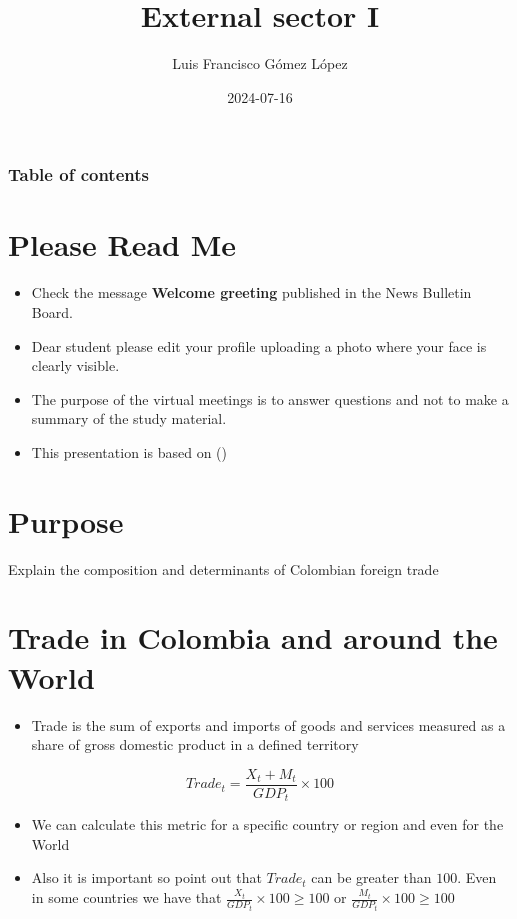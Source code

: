 \documentclass[
  ignorenonframetext,
]{beamer}
\title{External sector I}
\author{Luis Francisco Gómez López}
\date{2024-07-16}
\institute{FAEDIS}
\providecommand{\tightlist}{%
  \setlength{\itemsep}{0pt}\setlength{\parskip}{0pt}}\usepackage{longtable,booktabs,array}
\renewcommand*\contentsname{Table of contents}
\newcommand\contentsname{Table of contents}
\begin{document}
\frame{\titlepage}

\renewcommand*\contentsname{Table of contents}
\begin{frame}[allowframebreaks]
  \frametitle{Table of contents}
  \tableofcontents[hideallsubsections]
\end{frame}

\section{Please Read Me}\label{please-read-me}

\begin{frame}{}
\label{section}
\begin{itemize}
\item
  Check the message \textbf{Welcome greeting} published in the News
  Bulletin Board.
\item
  Dear student please edit your profile uploading a photo where your
  face is clearly visible.
\item
  The purpose of the virtual meetings is to answer questions and not to
  make a summary of the study material.
\item
  This presentation is based on
  ()
\end{itemize}
\end{frame}

\section{Purpose}\label{purpose}

\begin{frame}{}
\label{section-1}
Explain the composition and determinants of Colombian foreign trade
\end{frame}

\section{Trade in Colombia and around the
World}\label{trade-in-colombia-and-around-the-world}

\begin{frame}{}
\label{section-2}
\begin{itemize}
\tightlist
\item
  Trade is the sum of exports and imports of goods and services measured
  as a share of gross domestic product in a defined territory
\end{itemize}

\[Trade_t = \frac{X_t + M_t}{GDP_t} \times 100\]

\begin{itemize}
\item
  We can calculate this metric for a specific country or region and even
  for the World
\item
  Also it is important so point out that \(Trade_t\) can be greater than
  \(100\). Even in some countries we have that
  \(\frac{X_t}{GDP_t} \times 100 \geq 100\) or
  \(\frac{M_t}{GDP_t} \times 100 \geq 100\)
\end{itemize}
\end{frame}
\end{document}
